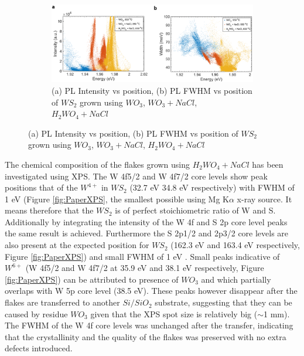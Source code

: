 \documentclass[12pt]{article}
\begin{document}
\begin{figure}[!h]
\begin{center}
		\begin{subfigure}[b]{0.8\textwidth}
			\includegraphics[scale=0.3]{PaperSIScatterComparison.png}
			\caption{(a) PL Intensity vs position, (b) PL FWHM vs position of $WS_2$ grown using $WO_3$, $WO_3+NaCl$, $H_2WO_4+NaCl$}
			\label{fig:PaperSIScatterComparison}
		\end{subfigure}
	\end{center}
\end{figure}

The chemical composition of the flakes grown using $H_2WO_4 + NaCl$ has been investigated using XPS. The W 4f5/2 and W 4f7/2 core levels show peak positions that of the $W^{4+}$ in $WS_2$ \cite{Cattelan2015}\cite{Martinez2004} (32.7 eV 34.8 eV respectively) with FWHM of 1 eV (Figure \ref{fig:PaperXPS}, the smallest possible using Mg K$\alpha$ x-ray source. It means therefore that the $WS_2$ is of perfect stoichiometric ratio of W and S. Additionally by integrating the intensity of the W 4f and S 2p core level peaks the same result is achieved. Furthermore the S 2p1/2 and 2p3/2 core levels are also present at the expected position for $WS_2$ (162.3 eV and 163.4 eV respectively, Figure \ref{fig:PaperXPS}) and small FWHM of 1 eV \cite{Martinez2004}. Small peaks indicative of $W^{6+}$ (W 4f5/2 and W 4f7/2 at 35.9 eV and 38.1 eV respectively, Figure \ref{fig:PaperXPS}) can be attributed to presence of $WO_3$ and which partially overlaps with W 5p core level (38.5 eV). These peaks however disappear after the flakes are transferred to another $Si/SiO_2$ substrate, suggesting that they can be caused by residue $WO_3$ given that the XPS spot size is relatively big ({$\sim$}1 mm). The FWHM of the W 4f core levels was unchanged after the transfer, indicating that the crystallinity and the quality of the flakes was preserved with no extra defects introduced.
\end{document}
